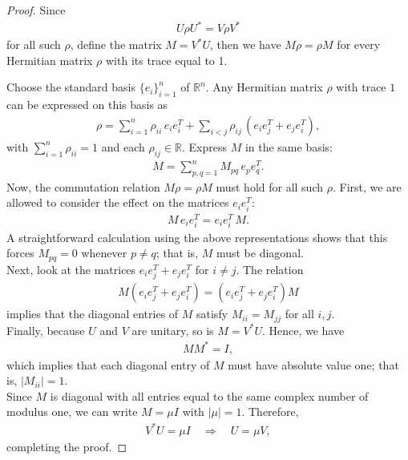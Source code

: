 \documentclass[sn-mathphys-num]{sn-jnl}%
\theoremstyle{thmstyleone}%
\theoremstyle{thmstyletwo}%
\theoremstyle{thmstylethree}%
\begin{document}
    \begin{proof}
        Since
        \begin{eqnarray*}
        U\rho U^* = V\rho V^*
        \end{eqnarray*}
        for all such $\rho$, define the matrix $M = V^* U$, then we have  $M\rho = \rho M$ 
        for every Hermitian matrix $\rho$ with its trace equal to 1.
        
        Choose the standard basis $\{e_i\}_{i=1}^n$ of $\mathbb{R}^n$. Any Hermitian matrix $\rho$ with trace $1$ can be expressed on this basis as
        \begin{eqnarray*}
        \rho = \sum_{i=1}^n \rho_{ii}\, e_i e_i^T + \sum_{i<j} \rho_{ij}\, (e_i e_j^T + e_j e_i^T),
        \end{eqnarray*}
        with $\sum_{i=1}^n \rho_{ii}=1$ and each $\rho_{ij}\in\mathbb{R}$.
        Express $M$ in the same basis:
        \begin{eqnarray*}
        M = \sum_{p,q=1}^n M_{pq}\, e_p e_q^T.
        \end{eqnarray*}
        Now, the commutation relation $M\rho = \rho M$ must hold for all such $\rho$. First, we are allowed to consider the effect on the matrices $e_i e_i^T$:
        \begin{eqnarray*}
        M\, e_i e_i^T = e_i e_i^T\, M.
        \end{eqnarray*}
        A straightforward calculation using the above representations shows that this forces $M_{pq} = 0$ whenever $p \neq q$; that is, $M$ must be diagonal.\\
        Next, look at the matrices $e_i e_j^T + e_j e_i^T$ for $i\neq j$. The relation
        \begin{eqnarray*}
        M(e_i e_j^T+e_j e_i^T) = (e_i e_j^T+e_j e_i^T) M
        \end{eqnarray*}
        implies that the diagonal entries of $M$ satisfy $M_{ii} = M_{jj}$ for all $i, j$.\\
        Finally, because $U$ and $V$ are unitary, so is $M = V^* U$. Hence, we have
        \begin{eqnarray*}
        MM^* = I,
        \end{eqnarray*}
        which implies that each diagonal entry of $M$ must have absolute value one; that is, $|M_{ii}|=1$.\\
        Since $M$ is diagonal with all entries equal to the same complex number of modulus one, we can write $M=\mu I$ with $|\mu|=1$. Therefore,
        \begin{eqnarray*}
        V^* U = \mu I \quad \Longrightarrow \quad U = \mu V,
        \end{eqnarray*}
        completing the proof.
    \end{proof}
\end{document}
